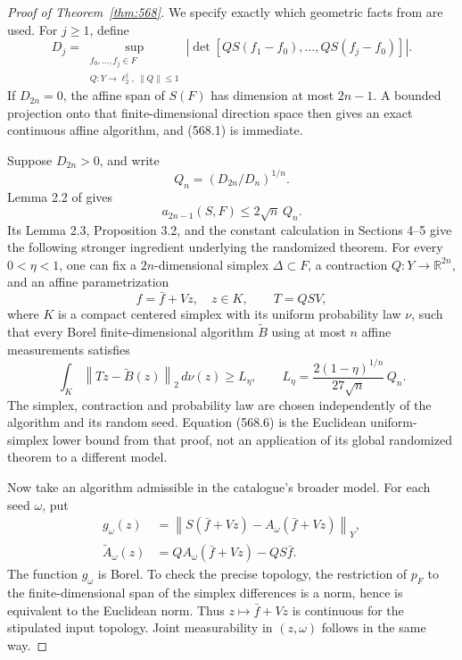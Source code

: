 \documentclass[11pt,a4paper]{article}
\newcommand{\R}{\mathbb R}
\newcommand{\norm}[1]{\left\lVert#1\right\rVert}
\newcommand{\abs}[1]{\left\lvert#1\right\rvert}
\theoremstyle{definition}
\theoremstyle{remark}
\numberwithin{equation}{section}
\begin{document}
\begin{proof}[Proof of Theorem~\ref{thm:568}]
We specify exactly which geometric facts from \cite{knu2026} are
used. For \(j\ge1\), define
\[
 D_j=\sup_{\substack{f_0,\ldots,f_j\in F\\
                    Q:Y\to\ell_2^j,\ \norm Q\le1}}
       \abs{\det[QS(f_1-f_0),\ldots,QS(f_j-f_0)]}.
 \tag{568.2}
\]
If \(D_{2n}=0\), the affine span of \(S(F)\) has dimension at most
\(2n-1\). A bounded projection onto that finite-dimensional
direction space then gives an exact continuous affine algorithm,
and (568.1) is immediate.

Suppose \(D_{2n}>0\), and write
\[
                         Q_n=(D_{2n}/D_n)^{1/n}.
 \tag{568.3}
\]
Lemma 2.2 of \cite{knu2026} gives
\[
                      a_{2n-1}(S,F)\le2\sqrt n\,Q_n.
 \tag{568.4}
\]
Its Lemma 2.3, Proposition 3.2, and the constant calculation in
Sections 4--5 give the following stronger ingredient underlying
the randomized theorem. For every \(0<\eta<1\), one can fix a
\(2n\)-dimensional simplex \(\Delta\subset F\), a contraction
\(Q:Y\to\R^{2n}\), and an affine parametrization
\[
             f=\bar f+Vz,\quad z\in K,\qquad T=QSV,
 \tag{568.5}
\]
where \(K\) is a compact centered simplex with its uniform
probability law \(\nu\), such that every Borel finite-dimensional
algorithm \(\widetilde B\) using at most \(n\) affine measurements
satisfies
\[
 \int_K\norm{Tz-\widetilde B(z)}_2\,d\nu(z)
      \ge L_\eta,\qquad
 L_\eta=\frac{2(1-\eta)^{1/n}}{27\sqrt n}\,Q_n .
 \tag{568.6}
\]
The simplex, contraction and probability law are chosen independently
of the algorithm and its random seed. Equation (568.6) is the
Euclidean uniform-simplex lower bound from that proof, not an
application of its global randomized theorem to a different model.

Now take an algorithm admissible in the catalogue's broader model.
For each seed \(\omega\), put
\[
\begin{split}
 g_\omega(z)
   &=\norm{S(\bar f+Vz)-A_\omega(\bar f+Vz)}_Y,\\
 \widetilde A_\omega(z)
   &=Q A_\omega(\bar f+Vz)-QS\bar f .
\end{split}
 \tag{568.7}
\]
The function \(g_\omega\) is Borel. To check the precise topology,
the restriction of \(p_F\) to the finite-dimensional span of the
simplex differences is a norm, hence is equivalent to the Euclidean
norm. Thus \(z\mapsto\bar f+Vz\) is continuous for the stipulated
input topology. Joint measurability in \((z,\omega)\) follows in
the same way.


\end{proof}
\end{document}

